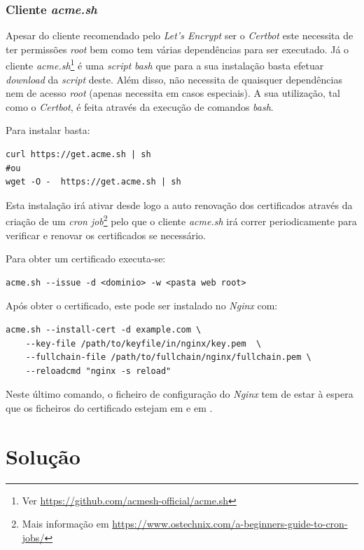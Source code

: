\subsubsection{Cliente \textit{acme.sh}}\label{sec:soaACMEsh}
Apesar do cliente recomendado pelo \textit{Let's Encrypt} ser o \textit{Certbot} este necessita de ter permissões \textit{root} bem como tem várias dependências para ser executado. Já o cliente \textit{acme.sh}\footnote{Ver \url{https://github.com/acmesh-official/acme.sh}} é uma \textit{script} \textit{bash} que para a sua instalação basta efetuar \textit{download} da \textit{script} deste. Além disso, não necessita de quaisquer dependências nem de acesso \textit{root} (apenas necessita em casos especiais). A sua utilização, tal como o \textit{Certbot}, é feita através da execução de comandos \textit{bash}.

Para instalar basta:
\begin{verbatim}
curl https://get.acme.sh | sh
#ou
wget -O -  https://get.acme.sh | sh
\end{verbatim}

Esta instalação irá ativar desde logo a auto renovação dos certificados através da criação de um \textit{cron job}\footnote{Mais informação em \url{https://www.ostechnix.com/a-beginners-guide-to-cron-jobs/}} pelo que o cliente \textit{acme.sh} irá correr periodicamente para verificar e renovar os certificados se necessário.

Para obter um certificado executa-se:
\begin{verbatim}
acme.sh --issue -d <dominio> -w <pasta web root>
\end{verbatim}

Após obter o certificado, este pode ser instalado no \textit{Nginx} com:
\begin{verbatim}
acme.sh --install-cert -d example.com \
    --key-file /path/to/keyfile/in/nginx/key.pem  \
    --fullchain-file /path/to/fullchain/nginx/fullchain.pem \
    --reloadcmd "nginx -s reload"
\end{verbatim}

Neste último comando, o ficheiro de configuração do \textit{Nginx} tem de estar à espera que os ficheiros do certificado estejam em  e em .

\section{Solução}

